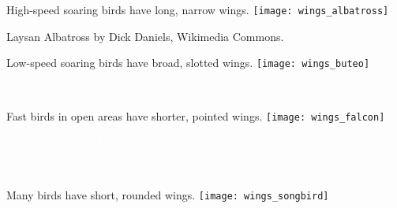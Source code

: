 \documentclass[t]{beamer}
\begin{document}
{
\begin{frame}[c,plain]{High-speed soaring birds have long, narrow wings.}
	\centering
	\texttt{[image: wings\_albatross]}\par
\end{frame}
}

{
\begin{frame}[b,plain]
	\tiny Laysan Albatross by Dick Daniels, Wikimedia Commons.
\end{frame}
}

{
\begin{frame}[c,plain]{Low-speed soaring birds have broad, slotted wings.}
	\centering
	\texttt{[image: wings\_buteo]}\par
\end{frame}
}

{
\begin{frame}[b,plain]
	\tiny\textcolor{white}{Turkey Vulture by Tatiana Gettleman, Flickr Creative Commons.}
\end{frame}
}


{
\begin{frame}[c,plain]{Fast birds in open areas have shorter, pointed wings.}
	\centering
	\texttt{[image: wings\_falcon]}\par
\end{frame}
}

{
\begin{frame}[b,plain]
	\tiny\hspace{10em}\textcolor{white}{Juvenile Peregrine Falcon (?) by Magnus Manske, Wikimedia Commons.}
\end{frame}
}

{
\begin{frame}[b,plain]
	\tiny\textcolor{white}{Mourning Dove \copyright Stephen Ramirez, All Rights Reserved. Used with permission.}
	\vspace{6ex}
\end{frame}
}


{
\begin{frame}[c,plain]{Many birds have short, rounded wings.}
	\centering
	\texttt{[image: wings\_songbird]}\par
\end{frame}
}
\end{document}
